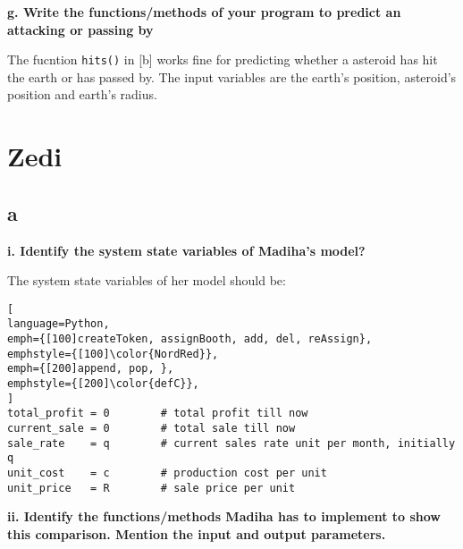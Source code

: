 \documentclass[article, 11pt, a4paper]{memoir}
\begin{document}
\textbf{g. Write the functions/methods of your program to predict an attacking or passing
by}
\vspace{1em}

\begin{solution}
    The fucntion \texttt{hits()} in [b] works fine for predicting whether a asteroid has
    hit the earth or has passed by. The input variables are the earth's position,
    asteroid's position and earth's radius.
\end{solution}


\chapter{Zedi}

\section{a}

\textbf{i. Identify the system state variables of Madiha's model?}
\vspace{1em}

\begin{solution}
    [a.i]
    The system state variables of her model should be:

\begin{lstlisting}[
language=Python,
emph={[100]createToken, assignBooth, add, del, reAssign},
emphstyle={[100]\color{NordRed}},
emph={[200]append, pop, },
emphstyle={[200]\color{defC}},
]
total_profit = 0        # total profit till now
current_sale = 0        # total sale till now
sale_rate    = q        # current sales rate unit per month, initially q
unit_cost    = c        # production cost per unit
unit_price   = R        # sale price per unit
\end{lstlisting}
\end{solution}  

\textbf{ii. Identify the functions/methods Madiha has to implement to show this
comparison. Mention the input and output parameters.}
\vspace{1em}
\end{document}
